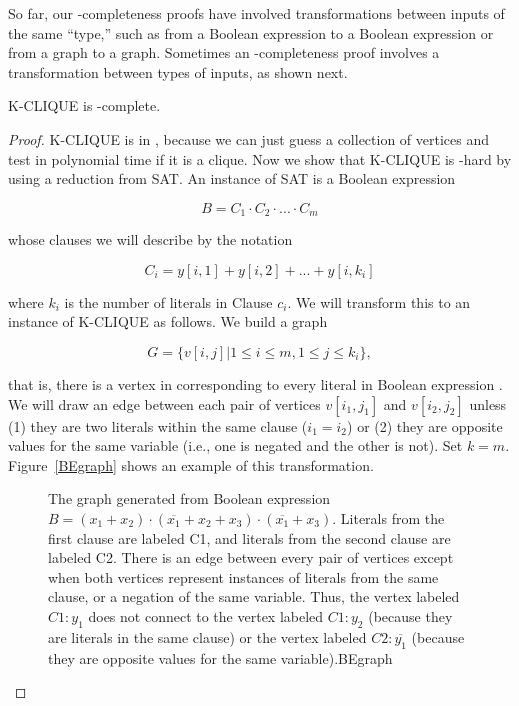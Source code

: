 \begin{example}

So far, our \NP-completeness proofs have involved
transformations between inputs of the same ``type,'' such as from
a Boolean expression  to a Boolean expression or from a graph to a
graph.
Sometimes an \NP-completeness proof involves a transformation between
types of inputs, as shown next.

\begin{theorem}
K-CLIQUE is \NP-complete.
\end{theorem}

\begin{proof}
K-CLIQUE is in \NP, because we can just guess a collection of 
vertices and test in polynomial time if it is a clique.
Now we show that K-CLIQUE is \NP-hard by using a reduction
from SAT.
An instance of SAT is a Boolean expression

\[B = C_1 \cdot C_2 \cdot ... \cdot C_m\]

\noindent whose clauses we will describe by the notation

\[C_i = y[i, 1] + y[i, 2] + ... + y[i, k_i]\]

\noindent where \(k_i\) is the number of literals in Clause \(c_i\).
We will transform this to an instance of K-CLIQUE as follows.
We build a graph

\[ G = \{v[i, j] | 1 \leq i \leq m, 1 \leq j \leq k_i\},\]

\noindent that is, there is a vertex in  corresponding to
every literal in Boolean expression .
We will draw an edge between each pair of vertices
\(v[i_1, j_1]\) and \(v[i_2, j_2]\) unless (1) they are two literals
within the same clause (\(i_1 = i_2\)) or (2) they are opposite values
for the same variable (i.e., one is negated and the other is not).
Set \(k = m\).
Figure~\ref{BEgraph} shows an example of this transformation.

\begin{figure}

\bigskip\bigskip
{}
{The graph generated from Boolean expression
\(B = (x_1 + x_2) \cdot (\overline{x_1} + x_2 + x_3) \cdot
(\overline{x_1} + x_3)\).
Literals from the first clause are labeled C1, and literals from the
second clause are labeled C2.
There is an edge between every pair of vertices except when both
vertices represent instances of literals from the same clause, or a
negation of the same variable.
Thus, the vertex labeled \(C1\!:\!y_1\) does not connect to the vertex
labeled \(C1\!:\!y_2\) (because they are literals in the same clause) or
the vertex labeled \(C2\!:\!\overline{y_1}\) (because they are opposite
values for the same variable).}{BEgraph}
\bigskip\bigskip
\end{figure}


\end{proof}
\end{example}
